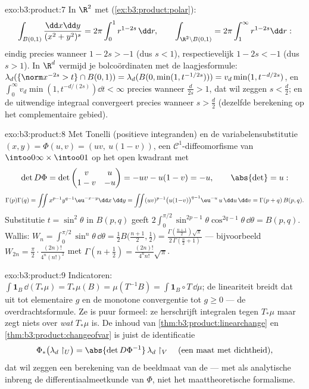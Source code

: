 \begin{solution}{exo:b3:product:7}
In $\R^2$ met  (\cref{ex:b3:product:polar}):
\[
\int_{B(0,1)}\frac{\dd x\dd y}{(x^2+y^2)^s}
= 2\pi\int_0^1 r^{1 - 2s}\,\dd r,
\qquad
\int_{\R^2\setminus B(0,1)} = 2\pi\int_1^\infty r^{1-2s}\dd r:
\]
eindig precies wanneer $1 - 2s > -1$ (dus $s < 1$),
respectievelijk $1 - 2s < -1$ (dus $s > 1$). In $\R^d$ vermijd je
bolcoördinaten met de laagjesformule: $\lambda_d(\{\norm x^{-2s} >
t\}\cap B(0,1)) = \lambda_d(B(0, \min(1, t^{-1/2s}))) =
v_d\min(1, t^{-d/2s})$, en $\int_0^\infty v_d\min(1,
t^{-d/(2s)})\dd t < \infty$ precies wanneer $\frac d{2s} > 1$, dat
wil zeggen $s < \frac d2$; en de uitwendige integraal convergeert
precies wanneer $s > \frac d2$ (dezelfde berekening op het
complementaire gebied).
\end{solution}

\begin{solution}{exo:b3:product:8}
Met Tonelli (positieve integranden) en de variabelensubstitutie
$(x, y) = \Phi(u, v) = (uv,\ u(1-v))$, een
$\mathcal C^1$-diffeomorfisme van $\intoo0\infty\times\intoo01$ op
het open kwadrant met
\[
\det D\Phi = \det\begin{pmatrix} v & u\\ 1 - v & -u
\end{pmatrix} = -uv - u(1 - v) = -u,
\qquad \abs{\det} = u :
\]
\[
\Gamma(p)\Gamma(q) =
\iint x^{p-1}y^{q-1}\eu^{-x-y}\dd x\,\dd y
= \iint (uv)^{p-1}\bigl(u(1{-}v)\bigr)^{q-1}\eu^{-u}\,u\,
\dd u\,\dd v
= \Gamma(p + q)\,B(p, q).
\]
Substitutie $t = \sin^2\theta$ in $B(p,q)$ geeft
$2\int_0^{\pi/2}\sin^{2p-1}\theta\cos^{2q-1}\theta\,\dd\theta =
B(p, q)$. Wallis: $W_n = \int_0^{\pi/2}\sin^n\theta\,\dd\theta =
\frac12B\bigl(\frac{n + 1}2, \frac12\bigr) =
\frac{\Gamma(\frac{n+1}2)\sqrt\pi} {2\,\Gamma(\frac n2 + 1)}$ ---
bijvoorbeeld $W_{2n} = \frac\pi2\cdot\frac{(2n)!}{4^n(n!)^2}$ met
$\Gamma(n + \frac12) = \frac{(2n)!}{4^nn!}\sqrt\pi$.
\end{solution}

\begin{solution}{exo:b3:product:9}
Indicatoren: $\int\mathbf 1_B\,\dd(T_*\mu) = T_*\mu(B) =
\mu(T^{-1}B) = \int\mathbf 1_B\circ T\,\dd\mu$; de lineariteit
breidt dat uit tot elementaire $g$ en de monotone convergentie tot
$g \geq 0$ --- de overdrachtsformule. Ze is puur formeel: ze
herschrijft integralen tegen $T_*\mu$ maar zegt niets over
\emph{wat} $T_*\mu$ is. De inhoud van
\cref{thm:b3:product:linearchange} en
\cref{thm:b3:product:changeofvar} is juist de identificatie
\[
\Phi_*\bigl(\lambda_d\restriction_U\bigr) =
\abs{\det D\Phi^{-1}}\,\lambda_d\restriction_V
\quad\text{(een maat met dichtheid)},
\]
dat wil zeggen een berekening van de beeldmaat van de
 --- met als analytische inbreng de
differentiaalmeetkunde van $\Phi$, niet het maattheoretische
formalisme.
\end{solution}

